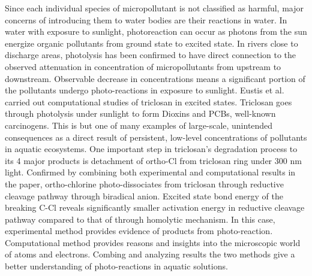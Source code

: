\documentclass[
journal=jpcbfk, %
manuscript=article]{achemso}
\begin{document}
	Since each individual species of micropollutant is not classified as harmful, major concerns of introducing them to water bodies are their reactions in water. In water with exposure to sunlight, photoreaction can occur as photons from the sun energize organic pollutants from ground state to excited state. In rivers close to discharge areas, photolysis has been confirmed to have direct connection to the observed attenuation in concentration of micropollutants from upstream to downstream.\cite{Conley2008,Daneshvar2010,Bonvin2011,Carlson2015} Observable decrease in concentrations means a significant portion of the pollutants undergo photo-reactions in exposure to sunlight. Eustis et al. carried out computational studies of triclosan in excited states.\cite{Kliegman2013}  Triclosan goes through photolysis under sunlight to form Dioxins and PCBs, well-known carcinogens.\cite{Bedoux2012} This is but one of many examples of large-scale, unintended consequences as a direct result of persistent, low-level concentrations of pollutants in aquatic ecosystems\cite{Morss2014}. One important step in triclosan's degradation process to its 4 major products is detachment of ortho-Cl from triclosan ring under 300 nm light. Confirmed by combining both experimental and computational results in the paper, ortho-chlorine photo-dissociates from triclosan through reductive cleavage pathway through biradical anion. Excited state bond energy of the breaking C-Cl reveals significantly smaller activation energy in reductive cleavage pathway compared to that of through homolytic mechanism. In this case, experimental method provides evidence of products from photo-reaction. Computational method provides reasons and insights into the microscopic world of atoms and electrons. Combing and analyzing results the two methods give a better understanding of photo-reactions in aquatic solutions. 
	
\end{document}
